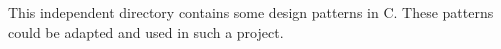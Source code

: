 This independent directory contains some design patterns in C. These patterns could be adapted and used in such a project. 